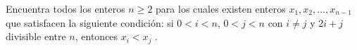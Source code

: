 Encuentra todos los enteros $n \ge 2$ para los cuales existen enteros $x_1, x_2, \dots , x_{n−1}$ que
satisfacen la siguiente condición: si $0 \lt i \lt n$, $0 \lt j \lt n$ con $i \neq j$ y $2i + j $ divisible entre $n$, entonces
$x_i \lt x_j$ .